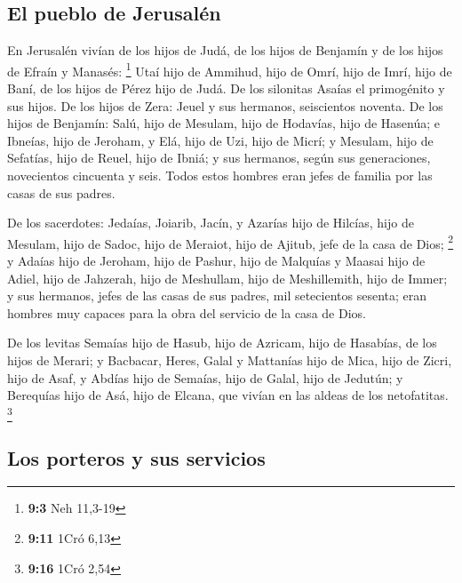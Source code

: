 \begin{paracol}{2}
\hypertarget{el-pueblo-de-jerusaluxe9n}{%
\subsection{El pueblo de Jerusalén}\label{el-pueblo-de-jerusaluxe9n}}

 En Jerusalén vivían de los hijos de Judá, de los hijos de
Benjamín y de los hijos de Efraín y Manasés: \footnote{\textbf{9:3} Neh
  11,3-19}  Utaí hijo de Ammihud, hijo de Omrí, hijo de
Imrí, hijo de Baní, de los hijos de Pérez hijo de Judá. 
De los silonitas Asaías el primogénito y sus hijos.  De
los hijos de Zera: Jeuel y sus hermanos, seiscientos noventa.
 De los hijos de Benjamín: Salú, hijo de Mesulam, hijo de
Hodavías, hijo de Hasenúa;  e Ibneías, hijo de Jeroham, y
Elá, hijo de Uzi, hijo de Micrí; y Mesulam, hijo de Sefatías, hijo de
Reuel, hijo de Ibniá;  y sus hermanos, según sus
generaciones, novecientos cincuenta y seis. Todos estos hombres eran
jefes de familia por las casas de sus padres.

 De los sacerdotes: Jedaías, Joiarib, Jacín,
 y Azarías hijo de Hilcías, hijo de Mesulam, hijo de
Sadoc, hijo de Meraiot, hijo de Ajitub, jefe de la casa de Dios;
\footnote{\textbf{9:11} 1Cró 6,13}  y Adaías hijo de
Jeroham, hijo de Pashur, hijo de Malquías y Maasai hijo de Adiel, hijo
de Jahzerah, hijo de Meshullam, hijo de Meshillemith, hijo de Immer;
 y sus hermanos, jefes de las casas de sus padres, mil
setecientos sesenta; eran hombres muy capaces para la obra del servicio
de la casa de Dios.

 De los levitas Semaías hijo de Hasub, hijo de Azricam,
hijo de Hasabías, de los hijos de Merari;  y Bacbacar,
Heres, Galal y Mattanías hijo de Mica, hijo de Zicri, hijo de Asaf,
 y Abdías hijo de Semaías, hijo de Galal, hijo de
Jedutún; y Berequías hijo de Asá, hijo de Elcana, que vivían en las
aldeas de los netofatitas. \footnote{\textbf{9:16} 1Cró 2,54}

\hypertarget{los-porteros-y-sus-servicios}{%
\subsection{Los porteros y sus
servicios}\label{los-porteros-y-sus-servicios}}


\end{paracol}
